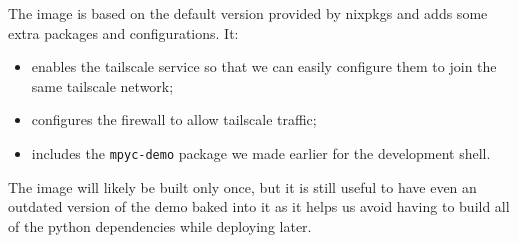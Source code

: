 \documentclass[
]{article}
\newenvironment{Shaded}{}{}
\newcommand{\CommentTok}[1]{\textcolor[rgb]{0.38,0.63,0.69}{\textit{#1}}}
\newcommand{\ConstantTok}[1]{\textcolor[rgb]{0.53,0.00,0.00}{#1}}
\newcommand{\KeywordTok}[1]{\textcolor[rgb]{0.00,0.44,0.13}{\textbf{#1}}}
\newcommand{\NormalTok}[1]{#1}
\newcommand{\OperatorTok}[1]{\textcolor[rgb]{0.40,0.40,0.40}{#1}}
\newcommand{\SpecialCharTok}[1]{\textcolor[rgb]{0.25,0.44,0.63}{#1}}
\newcommand{\StringTok}[1]{\textcolor[rgb]{0.25,0.44,0.63}{#1}}
\newcommand{\VariableTok}[1]{\textcolor[rgb]{0.10,0.09,0.49}{#1}}
\providecommand{\tightlist}{%
  \setlength{\itemsep}{0pt}\setlength{\parskip}{0pt}}
\begin{document}
\begin{Shaded}
\end{Shaded}

The image is based on the default version provided by nixpkgs and adds
some extra packages and configurations. It:

\begin{itemize}
  \tightlist
  \item
        enables the tailscale service so that we can easily configure them to
        join the same tailscale network;
  \item
        configures the firewall to allow tailscale traffic;
  \item
        includes the \texttt{mpyc-demo} package we made earlier for the
        development shell.
\end{itemize}

The image will likely be built only once, but it is still useful to have
even an outdated version of the demo baked into it as it helps us avoid
having to build all of the python dependencies while deploying later.
\end{document}
